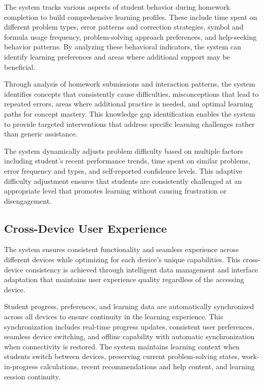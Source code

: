 \documentclass[conference]{IEEEtran}
\begin{document}
The system tracks various aspects of student behavior during homework completion to build comprehensive learning profiles. These include time spent on different problem types, error patterns and correction strategies, symbol and formula usage frequency, problem-solving approach preferences, and help-seeking behavior patterns. By analyzing these behavioral indicators, the system can identify learning preferences and areas where additional support may be beneficial.

Through analysis of homework submissions and interaction patterns, the system identifies concepts that consistently cause difficulties, misconceptions that lead to repeated errors, areas where additional practice is needed, and optimal learning paths for concept mastery. This knowledge gap identification enables the system to provide targeted interventions that address specific learning challenges rather than generic assistance.

The system dynamically adjusts problem difficulty based on multiple factors including student's recent performance trends, time spent on similar problems, error frequency and types, and self-reported confidence levels. This adaptive difficulty adjustment ensures that students are consistently challenged at an appropriate level that promotes learning without causing frustration or disengagement.

\subsection{Cross-Device User Experience}

The system ensures consistent functionality and seamless experience across different devices while optimizing for each device's unique capabilities. This cross-device consistency is achieved through intelligent data management and interface adaptation that maintains user experience quality regardless of the accessing device.

Student progress, preferences, and learning data are automatically synchronized across all devices to ensure continuity in the learning experience. This synchronization includes real-time progress updates, consistent user preferences, seamless device switching, and offline capability with automatic synchronization when connectivity is restored. The system maintains learning context when students switch between devices, preserving current problem-solving states, work-in-progress calculations, recent recommendations and help content, and learning session continuity.
\end{document}
